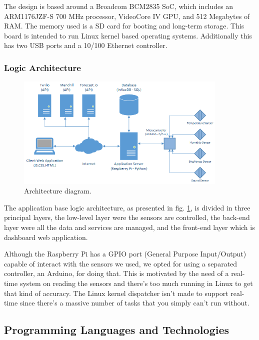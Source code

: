 \documentclass[12pt]{report}
\begin{document}
The design is based around a Broadcom BCM2835 SoC, which includes an ARM1176JZF-S 700 MHz processor, VideoCore IV GPU, and 512 Megabytes of RAM. The memory used is a SD card for booting and long-term storage. This board is intended to run Linux kernel based operating systems. Additionally this has two USB ports and a 10/100 Ethernet controller.

\subsubsection{Logic Architecture}

\begin{figure}[H]
    \centering
    \includegraphics[width=0.9\textwidth]{arc.png}
    \caption{Architecture diagram.}
    \label{fig:arc}
\end{figure}

The application base logic architecture, as presented in fig. \ref{fig:arc}, is divided in three principal layers, the low-level layer were the sensors are controlled, the back-end layer were all the data and services are managed, and the front-end layer which is dashboard web application.

Although the Raspberry Pi has a GPIO port (General Purpose Input/Output) capable of interact with the sensors we used, we opted for using a separated controller, an Arduino, for doing that. This is motivated by the need of a real-time system on reading the sensors and there's too much running in Linux to get that kind of accuracy. The Linux kernel dispatcher isn't made to support real-time since there's a massive number of tasks that you simply can't run without.

\subsection{Programming Languages and Technologies}
\end{document}
